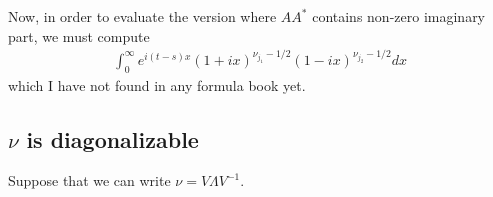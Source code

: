 \documentclass[11pt]{article}
\begin{document}
Now, in order to evaluate the version where $AA^*$ contains non-zero imaginary part, we must compute \begin{align*}
\int_0^\infty e^{i(t-s)x} (1 + ix)^{\nu_{j_1} - 1/2}(1 - ix)^{\nu_{j_2} - 1/2} dx
\end{align*}which I have not found in any formula book yet.



% 



% 

\subsection{$\nu$ is diagonalizable}


Suppose that we can write $\nu = V\Lambda V^{-1}$.
\end{document}
